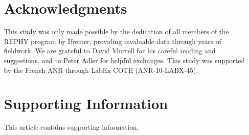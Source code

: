\documentclass[10pt]{article}
\begin{document}
\section*{Acknowledgments}

This study was only made possible by the dedication of all members
of the REPHY program \citep{REPHY_db} by Ifremer, providing invaluable
data through years of fieldwork. We are grateful to David Murrell
for his careful reading and suggestions, and to Peter Adler for helpful
exchanges. This study was supported by the French ANR through LabEx
COTE (ANR-10-LABX-45).

\section*{Supporting Information}

This article contains supporting information.

\nolinenumbers %
%
 

\end{document}
